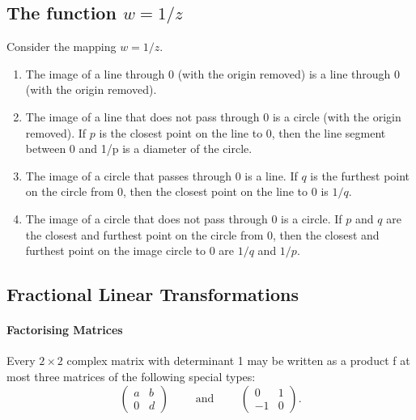 \subsection{The function \texorpdfstring{\(w = 1 / z\)}{w = 1/z}}
Consider the mapping \(w = 1 /z\).
\begin{enumerate}[label=(\arabic*)]
    \item The image of a line through 0 (with the origin removed) is a line through 0 (with the origin removed).
    \item The image of a line that does not pass through 0 is a circle (with the origin removed). If \(p\) is the closest point on the line to 0, then the line segment between 0 and 1/p is a diameter of the circle.
    \item The image of a circle that passes through 0 is a line. If \(q\) is the furthest point on the circle from 0, then the closest point on the line to 0 is \(1/q\).
    \item The image of a circle that does not pass through 0 is a circle. If \(p\) and \(q\) are the closest and furthest point on the circle from 0, then the closest and furthest point on the image circle to 0 are \(1 / q\) and \(1 / p\).
\end{enumerate}

\subsection{Fractional Linear Transformations}
\paragraph{Factorising Matrices}
Every \(2 \times 2\) complex matrix with determinant 1 may be written as a product f at most three matrices of the following special types:
\[\begin{pmatrix}
    a & b \\
    0 & d
\end{pmatrix} \qquad \text{ and } \qquad
\begin{pmatrix}
    0 & 1 \\
    -1 & 0
\end{pmatrix}.\]